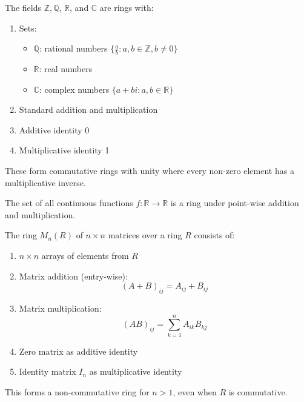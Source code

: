   \begin{example}
    The fields $\mathbb{Z}, \mathbb{Q}$, $\mathbb{R}$, and $\mathbb{C}$ are rings with:
    \begin{enumerate}
      \item Sets: 
        \begin{itemize}
          \item $\mathbb{Q}$: rational numbers $\{\frac{a}{b} : a,b \in \mathbb{Z}, b \neq 0\}$
          \item $\mathbb{R}$: real numbers
          \item $\mathbb{C}$: complex numbers $\{a + bi : a,b \in \mathbb{R}\}$
        \end{itemize}
      \item Standard addition and multiplication
      \item Additive identity 0
      \item Multiplicative identity 1
    \end{enumerate}
    These form commutative rings with unity where every non-zero element has a multiplicative inverse.
  \end{example}

  \begin{example}
    The set of all continuous functions $f: \mathbb{R} \rightarrow \mathbb{R}$ is a ring under point-wise addition and multiplication. 
  \end{example}

  \begin{example}[Matrices]
    The ring $M_n(R)$ of $n \times n$ matrices over a ring $R$ consists of:
    \begin{enumerate}
      \item $n \times n$ arrays of elements from $R$
      \item Matrix addition (entry-wise):
      \begin{equation}
        (A + B)_{ij} = A_{ij} + B_{ij}
      \end{equation}
      \item Matrix multiplication:
      \begin{equation}
        (AB)_{ij} = \sum_{k=1}^n A_{ik}B_{kj}
      \end{equation}
      \item Zero matrix as additive identity
      \item Identity matrix $I_n$ as multiplicative identity
    \end{enumerate}
    This forms a non-commutative ring for $n > 1$, even when $R$ is commutative.
  \end{example}

